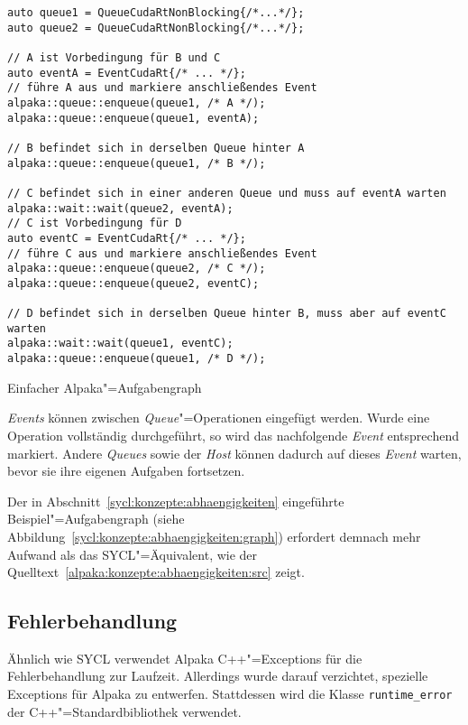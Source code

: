 \begin{code}
    \begin{verbatim}
auto queue1 = QueueCudaRtNonBlocking{/*...*/};
auto queue2 = QueueCudaRtNonBlocking{/*...*/};

// A ist Vorbedingung für B und C
auto eventA = EventCudaRt{/* ... */};
// führe A aus und markiere anschließendes Event
alpaka::queue::enqueue(queue1, /* A */);
alpaka::queue::enqueue(queue1, eventA);

// B befindet sich in derselben Queue hinter A
alpaka::queue::enqueue(queue1, /* B */);

// C befindet sich in einer anderen Queue und muss auf eventA warten
alpaka::wait::wait(queue2, eventA);
// C ist Vorbedingung für D
auto eventC = EventCudaRt{/* ... */};
// führe C aus und markiere anschließendes Event
alpaka::queue::enqueue(queue2, /* C */);
alpaka::queue::enqueue(queue2, eventC);

// D befindet sich in derselben Queue hinter B, muss aber auf eventC warten
alpaka::wait::wait(queue1, eventC);
alpaka::queue::enqueue(queue1, /* D */);
    \end{verbatim}
    \caption{Einfacher Alpaka"=Aufgabengraph}
    \label{alpaka:konzepte:abhaengigkeiten:src}
\end{code}
\vspace{3mm}
\textit{Events} können zwischen \textit{Queue}"=Operationen eingefügt werden.
Wurde eine Operation vollständig durchgeführt, so wird das nachfolgende
\textit{Event} entsprechend markiert. Andere \textit{Queues} sowie der
\textit{Host} können dadurch auf dieses \textit{Event} warten, bevor sie ihre
eigenen Aufgaben fortsetzen.

Der in Abschnitt~\ref{sycl:konzepte:abhaengigkeiten} eingeführte
Beispiel"=Aufgabengraph (siehe
Abbildung~\ref{sycl:konzepte:abhaengigkeiten:graph}) erfordert demnach mehr
Aufwand als das SYCL"=Äquivalent, wie der
Quelltext~\ref{alpaka:konzepte:abhaengigkeiten:src} zeigt.

\subsection{Fehlerbehandlung}

Ähnlich wie SYCL verwendet Alpaka C++"=Exceptions für die Fehlerbehandlung zur
Laufzeit. Allerdings wurde darauf verzichtet, spezielle Exceptions für Alpaka
zu entwerfen. Stattdessen wird die Klasse \texttt{runtime\_error} der
C++"=Standardbibliothek verwendet.

